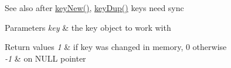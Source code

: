\begin{DoxySeeAlso}{See also}
after \hyperlink{group__key_gad23c65b44bf48d773759e1f9a4d43b89}{key\+New()}, \hyperlink{group__key_gae6ec6a60cc4b8c1463fa08623d056ce3}{key\+Dup()} keys need sync
\end{DoxySeeAlso}

\begin{DoxyParams}{Parameters}
{\em key} & the key object to work with \\
\hline
\end{DoxyParams}

\begin{DoxyRetVals}{Return values}
{\em 1} & if {\ttfamily key} was changed in memory, 0 otherwise \\
\hline
{\em -\/1} & on N\+U\+LL pointer \\
\hline
\end{DoxyRetVals}

